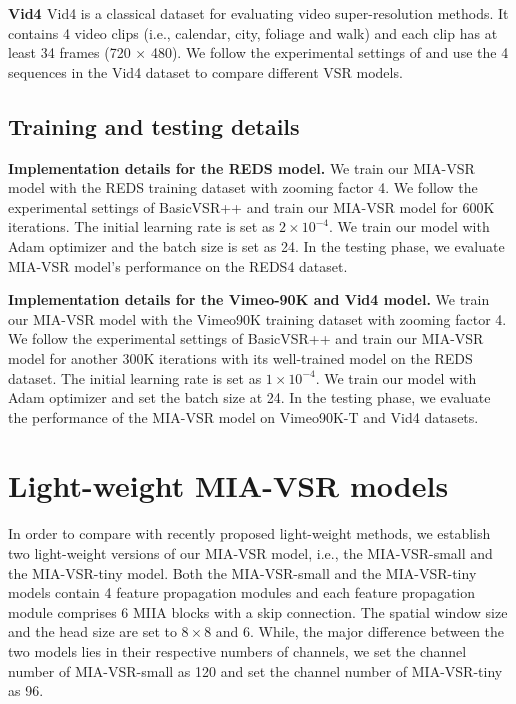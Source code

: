 \documentclass[10pt,twocolumn,letterpaper]{article}
\begin{document}
\vspace{3mm}
\noindent
\textbf{Vid4 \cite{liu2013bayesian}} Vid4 is a classical dataset for evaluating video super-resolution methods.
%
It contains 4 video clips (i.e., calendar,
city, foliage and walk) and each clip has at least 34 frames (720 × 480).
%
We follow the experimental settings of \cite{chan2020basicvsr,chan2022basicvsr++,shi2022rethinking} and use the 4 sequences in the Vid4 dataset to compare different VSR models.



\subsection{{Training and testing details}}
\noindent
\textbf{Implementation details for the REDS model.} 
We train our MIA-VSR model with the REDS \cite{nah2019ntire} training
dataset with zooming factor 4.
%
We follow the experimental settings of BasicVSR++ \cite{chan2022basicvsr++} and train our MIA-VSR model for 600K iterations.
%
The initial learning rate is set as $2 \times 10^{-4}$. 
%
We train our model with Adam optimizer and the batch size is set as 24.
%
In the testing phase, we evaluate MIA-VSR model's performance on the REDS4 \cite{nah2019ntire} dataset.

\vspace{3mm}
\noindent
\textbf{Implementation details for the Vimeo-90K and Vid4 model.}
We train our MIA-VSR model with the Vimeo90K \cite{nah2019ntire} training
dataset with zooming factor 4.
We follow the experimental settings of BasicVSR++ \cite{chan2022basicvsr++} and train our MIA-VSR model for another 300K iterations with its well-trained model on the REDS dataset.
%
The initial learning rate is set as $1 \times 10^{-4}$. 
%
We train our model with Adam optimizer and set the batch size at
24.
%
In the testing phase, we evaluate the performance of the MIA-VSR model on Vimeo90K-T \cite{xue2019video} and Vid4 \cite{liu2013bayesian} datasets.

\section{Light-weight MIA-VSR models }\label{b}
In order to compare with recently proposed light-weight methods,
we establish two light-weight versions of our MIA-VSR model, i.e., the MIA-VSR-small and the MIA-VSR-tiny model.
%
Both the MIA-VSR-small and the MIA-VSR-tiny models contain 4 feature propagation modules and each feature propagation module comprises 6 MIIA blocks with a skip connection.
%
The spatial window size and the head size are set to $8\times 8$ and 6.
%
While, the major difference between the two models lies in their respective numbers of channels, we set the channel number of MIA-VSR-small as 120 and set the channel number of
MIA-VSR-tiny as 96.
\end{document}
